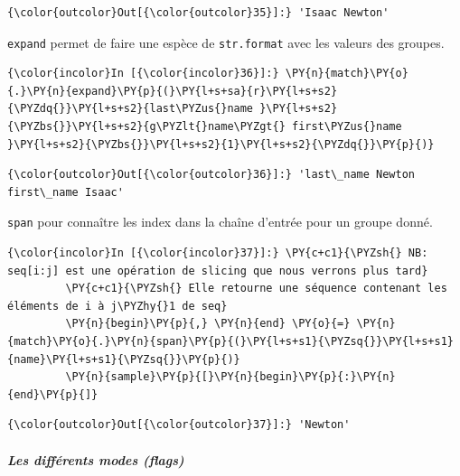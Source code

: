 \begin{Verbatim}[commandchars=\\\{\}]
{\color{outcolor}Out[{\color{outcolor}35}]:} 'Isaac Newton'
\end{Verbatim}
            
    \texttt{expand} permet de faire une espèce de \texttt{str.format} avec
les valeurs des groupes.

    \begin{Verbatim}[commandchars=\\\{\}]
{\color{incolor}In [{\color{incolor}36}]:} \PY{n}{match}\PY{o}{.}\PY{n}{expand}\PY{p}{(}\PY{l+s+sa}{r}\PY{l+s+s2}{\PYZdq{}}\PY{l+s+s2}{last\PYZus{}name }\PY{l+s+s2}{\PYZbs{}}\PY{l+s+s2}{g\PYZlt{}name\PYZgt{} first\PYZus{}name }\PY{l+s+s2}{\PYZbs{}}\PY{l+s+s2}{1}\PY{l+s+s2}{\PYZdq{}}\PY{p}{)}
\end{Verbatim}


\begin{Verbatim}[commandchars=\\\{\}]
{\color{outcolor}Out[{\color{outcolor}36}]:} 'last\_name Newton first\_name Isaac'
\end{Verbatim}
            
    \texttt{span} pour connaître les index dans la chaîne d'entrée pour un
groupe donné.

    \begin{Verbatim}[commandchars=\\\{\}]
{\color{incolor}In [{\color{incolor}37}]:} \PY{c+c1}{\PYZsh{} NB: seq[i:j] est une opération de slicing que nous verrons plus tard}
         \PY{c+c1}{\PYZsh{} Elle retourne une séquence contenant les éléments de i à j\PYZhy{}1 de seq}
         \PY{n}{begin}\PY{p}{,} \PY{n}{end} \PY{o}{=} \PY{n}{match}\PY{o}{.}\PY{n}{span}\PY{p}{(}\PY{l+s+s1}{\PYZsq{}}\PY{l+s+s1}{name}\PY{l+s+s1}{\PYZsq{}}\PY{p}{)}
         \PY{n}{sample}\PY{p}{[}\PY{n}{begin}\PY{p}{:}\PY{n}{end}\PY{p}{]}
\end{Verbatim}


\begin{Verbatim}[commandchars=\\\{\}]
{\color{outcolor}Out[{\color{outcolor}37}]:} 'Newton'
\end{Verbatim}
            
    \hypertarget{les-diffuxe9rents-modes-flags}{%
\subparagraph{\texorpdfstring{Les différents modes
(\emph{flags})\\\\}{Les différents modes (flags)}}\label{les-diffuxe9rents-modes-flags}}

